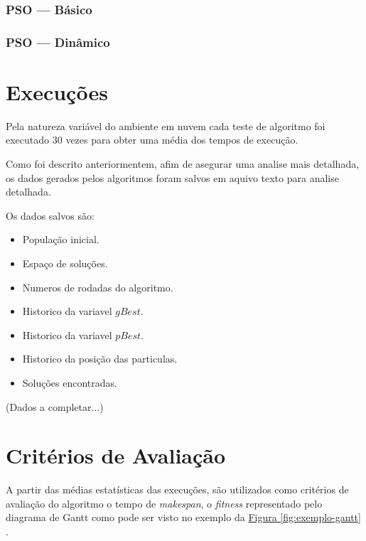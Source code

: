         \subsubsection{PSO — Básico}

        \subsubsection{PSO — Dinâmico}

    



\section{Execuções}
    Pela natureza variável do ambiente em nuvem cada teste de algoritmo foi executado 30 vezes para obter uma média dos tempos de execução.\newline
    
    Como foi descrito anteriormentem, afim de asegurar uma analise mais detalhada, os dados gerados pelos algoritmos foram salvos em aquivo texto para analise detalhada.\newline
    
    Os dados salvos são:
    \begin{itemize}
        \item População inicial.
        \item Espaço de soluções.
        \item Numeros de rodadas do algoritmo.
        \item Historico da variavel $gBest$.
        \item Historico da variavel $pBest$.
        \item Historico da posição das particulas.
        \item Soluções encontradas.
    \end{itemize}
    
    (Dados a completar...)


\section{Critérios de Avaliação}
    A partir das médias estatísticas das execuções, são utilizados como critérios de avaliação do algoritmo o tempo de \textit{makespan}, o \textit{fitness} representado pelo diagrama de Gantt como pode ser visto no exemplo da 
    \hyperref[fig:exemplo-gantt]{Figura \ref{fig:exemplo-gantt}}
    .

